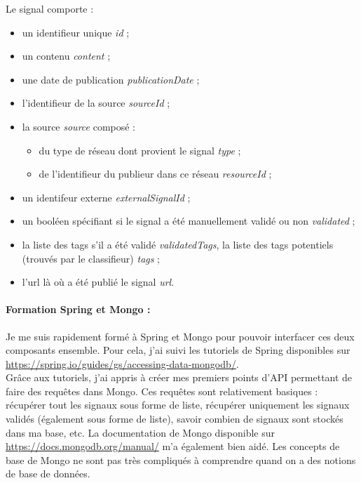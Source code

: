        Le signal comporte :
        \begin{itemize}
            \item un identifieur unique \textit{id} ;
            \item un contenu \textit{content} ;
            \item une date de publication \textit{publicationDate} ;
            \item l'identifieur de la source \textit{sourceId} ;
            \item la source \textit{source} composé :
            \begin{itemize}
                \item du type de réseau dont provient le signal \textit{type} ;
                \item de l'identifieur du publieur dans ce réseau \textit{resourceId} ;
            \end{itemize}
            \item un identifeur externe \textit{externalSignalId} ;
            \item un booléen spécifiant si le signal a été manuellement validé ou non \textit{validated} ;
            \item la liste des tags s'il a été validé \textit{validatedTags}, la liste des tags potentiels (trouvés par le classifieur) \textit{tags} ;
            \item l'url là où a été publié le signal \textit{url}.
        \end{itemize}

        \paragraph{Formation Spring et Mongo :}
            Je me suis rapidement formé à Spring et Mongo pour pouvoir interfacer ces deux composants ensemble. Pour cela, j'ai suivi les tutoriels de Spring disponibles sur \href{https://spring.io/guides/gs/accessing-data-mongodb/}{https://spring.io/guides/gs/accessing-data-mongodb/}.\\
            Grâce aux tutoriels, j'ai appris à créer mes premiers points d'API permettant de faire des requêtes dans Mongo. Ces requêtes sont relativement basiques : récupérer tout les signaux sous forme de liste, récupérer uniquement les signaux validés (également sous forme de liste), savoir combien de signaux sont stockés dans ma base, etc. La documentation de Mongo disponible sur \href{https://docs.mongodb.org/manual/}{https://docs.mongodb.org/manual/} m'a également bien aidé. Les concepts de base de Mongo ne sont pas très compliqués à comprendre quand on a des notions de base de données.\\


